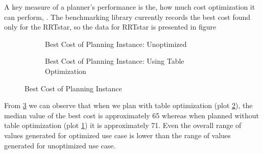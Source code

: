 A key measure of a planner's performance is the, how much cost optimization it can perform, \citet{sucan2012the-open-motion-planning-library}. The benchmarking library currently records the best cost found only for the RRTstar, so the data for RRTstar is presented in figure 

\begin{figure}[!htbp] %
	\centering
	\begin{subfigure}[b]{0.4\textwidth}
		\caption{Best Cost of Planning Instance: Unoptimized}
		\label{fig:bc1}
	\end{subfigure}
	\begin{subfigure}[b]{0.4\textwidth}
		\caption{Best Cost of Planning Instance: Using Table Optimization}
		\label{fig:bc2}
	\end{subfigure}	
	\caption{Best Cost of Planning Instance}
	\label{fig:bc}
\end{figure}

From \ref{fig:bc} we can observe that when we plan with table optimization (plot \ref{fig:bc2}), the median value of the best cost is approximately 65 whereas  when planned without table optimization (plot \ref{fig:bc1}) it is approximately 71. Even the overall range of values generated for optimized use case is lower than the range of values generated for unoptimized use case.

